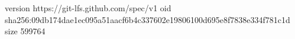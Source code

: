 version https://git-lfs.github.com/spec/v1
oid sha256:09db174dae1ec095a51aacf6b4c337602e19806100d695e8f7838e334f781c1d
size 599764

